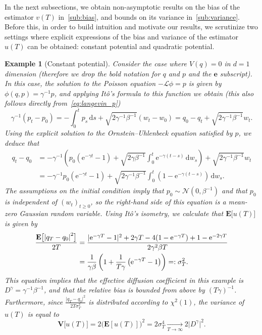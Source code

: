 \documentclass[11pt,a4paper]{article}
\newcommand{\e}{\mathrm{e}}
\newcommand{\expect}[0]{\mathbf{E}}
\newcommand{\var}[0]{\mathbf{V}}
\newcommand{\vect}[1]{\boldsymbol{\mathbf #1}}
\renewcommand{\d}{\mathrm d}
\theoremstyle{plain}
\newtheorem{example}{Example}[section]
\numberwithin{equation}{section}
\renewcommand{\geq}{\geqslant}
\begin{document}
In the next subsections,
we obtain non-asymptotic results on the bias of the estimator $v(T)$ in~\cref{sub:bias},
and bounds on its variance in~\cref{sub:variance}.
Before this,
in order to build intuition and motivate our results,
we scrutinize two settings where
explicit expressions of the bias and variance of the estimator $u(T)$ can be obtained:
constant potential and quadratic potential.
\begin{example}
    [Constant potential]
    \label{example:constant}
    Consider the case where $V(q) = 0$ in $d = 1$ dimension
    (therefore we drop the bold notation for $q$ and $p$ and the $\vect e$ subscript).
    In this case, the solution to the Poisson equation $- \mathcal L \phi = p$ is given by $\phi(q, p) = \gamma^{-1} p$,
    and applying Itô's formula to this function we obtain
    (this also follows directly from~\eqref{eq:langevin_p})
    \[
        \gamma^{-1}(p_t - p_0) = - \int_{0}^{t} p_s \, \d s + \sqrt{2 \gamma^{-1} \beta^{-1}} (w_t - w_0)
        = q_0 - q_t + \sqrt{2 \gamma^{-1} \beta^{-1}} w_t.
    \]
    Using the explicit solution to the Ornstein--Uhlenbeck equation satisfied by $p$,
    we deduce that
    \begin{align*}
        q_t - q_0
        &= - \gamma^{-1} \left( p_0 \left(\e^{-\gamma t} - 1\right) + \sqrt{2 \gamma \beta^{-1}}\int_{0}^{t} \e^{-\gamma (t - s)} \, \d w_s \right)
        + \sqrt{2 \gamma^{-1} \beta^{-1}} w_t \\
        &=  - \gamma^{-1} p_0 \left(\e^{-\gamma t} - 1\right) + \sqrt{2 \gamma^{-1} \beta^{-1}}\int_{0}^{t} \left(1 - \e^{-\gamma (t - s)}\right) \, \d w_s.
    \end{align*}
    The assumptions on the initial condition imply that $p_0 \sim \mathcal N(0, \beta^{-1})$ and that $p_0$ is independent of $(w_t)_{t \geq 0}$,
    so the right-hand side of this equation is a mean-zero Gaussian random variable.
    Using It\^o's isometry, we calculate that $\expect \bigl[ u(T) \bigr]$ is given by
    \begin{align*}
        \frac{\expect \bigl[\abs{q_T - q_0}^2\bigr]}{2T}
        &= \frac{\lvert \e^{-\gamma T} - 1 \rvert^2 + 2 \gamma T - 4 (1 - \e^{-\gamma T}) +  1 - \e^{-2 \gamma T}}{2 \gamma^2 \beta T} \\
        &= \frac{1}{\gamma \beta} \left( 1 + \frac{1}{T \gamma} \left(\e^{-\gamma T} - 1\right) \right) =: \sigma_T^2.
    \end{align*}
    This equation implies that the effective diffusion coefficient in this example is $D^{\gamma} = \gamma^{-1} \beta^{-1}$,
    and that the relative bias is bounded from above by $(T \gamma)^{-1}$.
    Furthermore,
    since $\frac{\lvert q_T- q_0 \rvert^2}{2T\sigma_T^2}$ is distributed according to $\chi^2(1)$,
    the variance of $u(T)$ is equal to
    \[
        \var \bigl[u(T)\bigr] = 2  \bigl(\expect [u(T)]\bigr)^2 = 2 \sigma_T^4 \xrightarrow[T \to \infty]{} 2 \lvert D^{\gamma} \rvert^2 .
    \]
\end{example}
\end{document}
